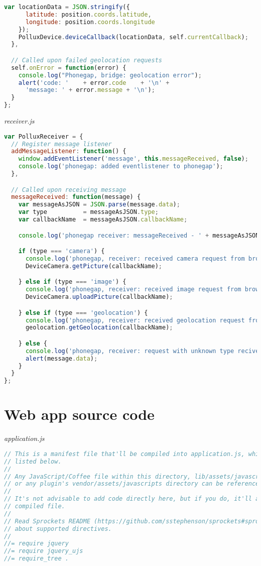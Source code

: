 \begin{appendices}
\begin{lstlisting}[language=JavaScript]
    var locationData = JSON.stringify({
      latitude: position.coords.latitude,
      longitude: position.coords.longitude
    });
    PolluxDevice.deviceCallback(locationData, self.currentCallback);
  },

  // Called upon failed geolocation requests
  self.onError = function(error) {
    console.log("Phonegap, bridge: geolocation error");
    alert('code: '    + error.code    + '\n' +
      'message: ' + error.message + '\n');
  }
};
\end{lstlisting}
\emph{receiver.js}
\begin{lstlisting}[language=JavaScript]
var PolluxReceiver = {
  // Register message listener
  addMessageListener: function() {
    window.addEventListener('message', this.messageReceived, false);
    console.log('phonegap: added eventlistener to phonegap');
  },

  // Called upon receiving message
  messageReceived: function(message) {
    var messageAsJSON = JSON.parse(message.data);
    var type          = messageAsJSON.type;
    var callbackName  = messageAsJSON.callbackName;

    console.log('phonegap receiver: messageReceived - ' + messageAsJSON);

    if (type === 'camera') {
      console.log('phonegap, receiver: received camera request from browser');
      DeviceCamera.getPicture(callbackName);

    } else if (type === 'image') {
      console.log('phonegap, receiver: received image request from browser');
      DeviceCamera.uploadPicture(callbackName);

    } else if (type === 'geolocation') {
      console.log('phonegap, receiver: received geolocation request from browser');
      geolocation.getGeolocation(callbackName);

    } else {
      console.log('phonegap, receiver: request with unknown type recived');
      alert(message.data);
    }
  }
};
\end{lstlisting}

\section{Web app source code} \label{app:web-app-source-code-phonegap}
\emph{application.js}
\begin{lstlisting}[language=JavaScript]
// This is a manifest file that'll be compiled into application.js, which will include all the files
// listed below.
//
// Any JavaScript/Coffee file within this directory, lib/assets/javascripts, vendor/assets/javascripts,
// or any plugin's vendor/assets/javascripts directory can be referenced here using a relative path.
//
// It's not advisable to add code directly here, but if you do, it'll appear at the bottom of the
// compiled file.
//
// Read Sprockets README (https://github.com/sstephenson/sprockets#sprockets-directives) for details
// about supported directives.
//
//= require jquery
//= require jquery_ujs
//= require_tree .


\end{lstlisting}
\end{appendices}
